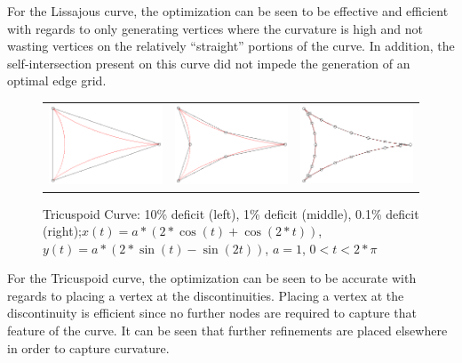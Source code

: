 For the Lissajous curve, the optimization can be seen to be effective and 
efficient with regards to only generating vertices where the curvature is high and not wasting vertices on the relatively ``straight'' portions of the curve. In addition, the self-intersection present on this curve did not impede the generation of an optimal edge grid.

\begin{figure}[h!]
  \centering
  \begin{tabular}{ccc}
  \includegraphics[width=0.3\linewidth]{Figures/tricuspoid01.png} &
  \includegraphics[width=0.3\linewidth]{Figures/tricuspoid001.png} &
  \includegraphics[width=0.3\linewidth]{Figures/tricuspoid0001.png}
  \end{tabular}
  \caption{\label{fig:tricuspoid} Tricuspoid Curve: 10\% deficit (left), 
1\% deficit (middle), 0.1\% deficit (right);\newline $x(t) = a*(2*\cos(t) 
+ \cos(2*t))$, $y(t) = a*(2*\sin(t) - \sin(2t))$, $a=1$, $0<t<2*\pi$}
\end{figure}

For the Tricuspoid curve, the optimization can be seen to be accurate with regards to placing a vertex at the discontinuities. Placing a vertex at the discontinuity is efficient since no further nodes are required to capture that feature of the curve. It can be seen that further refinements are placed elsewhere in order to capture curvature.

